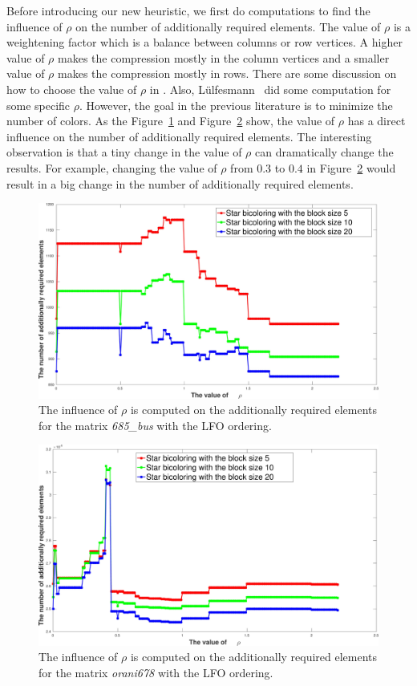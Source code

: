 \documentclass[12pt, twoside,a4paper,toc=bibliography]{scrbook}
\newcommand{\figref}[1]{Figure~\protect\ref{#1}}
\begin{document}
Before introducing our new heuristic,
we first do computations to find the influence of $\rho$ on the
number of additionally required elements.
The value of $\rho$ is a weightening factor which
is a balance between columns or row vertices. A higher value of $\rho$
makes the compression mostly in the column vertices and
a smaller value of $\rho$ makes the compression mostly in rows.
There are some discussion on how to choose the value of $\rho$ in
\cite{Gebremedhin05whatcolor}. Also,
Lülfesmann~\cite{Lulfesmann2012Fap,LulfesmannMaster} did some computation for some specific $\rho$.
However, the goal in the previous literature is to minimize the number of colors.
As the \figref{rho_value_685_bus} and \figref{rho_value_orani678} show,
the value of $\rho$ has a direct influence on
the number of additionally required elements.
The interesting observation is that a tiny change
in the value of $\rho$ can dramatically change the
results. For example, changing the value of $\rho$ from
$0.3$ to $0.4$ in \figref{rho_value_orani678} would result
in a big change in the number of additionally required elements.

\begin{figure}
\includegraphics[width=0.9\linewidth]{rho_value_685_bus}
\caption{The influence of $\rho$ is computed on the additionally required elements
for the matrix \textit{685\_bus} with the LFO ordering.}
\label{rho_value_685_bus}
\end{figure}

\begin{figure}
\includegraphics[width=0.9\linewidth]{rho_value_orani678}
\caption{The influence of $\rho$ is computed on the additionally required elements
for the matrix \textit{orani678} with the LFO ordering.}
\label{rho_value_orani678}
\end{figure}
\end{document}

